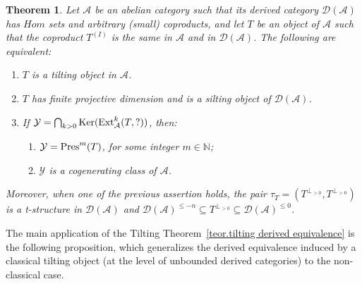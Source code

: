 \documentclass{proc-l}
\newcommand{\Ext}{{\rm Ext}}
\newtheorem{theorem}{Theorem}[section]
\theoremstyle{definition}
\theoremstyle{remark}
\numberwithin{equation}{section}
\begin{document}
\begin{theorem}{\rm\cite{NSZM}}
Let $\mathcal{A}$ be an abelian category such that its derived category $\mathcal{D}(\mathcal{A})$ has $Hom$ sets and arbitrary (small) coproducts,  and let $T$ be an object of $\mathcal{A}$ such that the coproduct $T^{(I)}$ is the same in $\mathcal{A}$ and in 
$\mathcal{D}(\mathcal{A})$. The following are equivalent:
\begin{enumerate}
\item $T$ is a tilting object in $\mathcal{A}$.
\item $T$ has finite projective dimension and is a silting object of $\mathcal{D}(\mathcal{A})$.
\item If $\mathcal{Y}=\bigcap_{k>0}{\rm Ker}(\Ext^k_\mathcal{A}(T,?))$, then:
\begin{enumerate}
\item[\rm (a)]$\mathcal{Y}={\rm Pres}^m(T)$, for some integer $m \in \mathbb{N}$;
\item[\rm (b)]
$\mathcal{Y}$ is a cogenerating class of $\mathcal{A}$.
\end{enumerate}
\end{enumerate}
Moreover, when one of the previous assertion holds, the pair $\tau_T =(T^{\perp_{>0}},T^{\perp_{>0}})$ is a t-structure in $\mathcal{D}(\mathcal{A})$ and $\mathcal{D}(\mathcal{A})^{\leq-n}\subseteq T^{\perp_{>0}} \subseteq \mathcal{D}(\mathcal{A})^{\leq0}$. 
\end{theorem}




The main application of the Tilting Theorem~\ref{teor.tilting derived equivalence} 
is the following proposition, which generalizes the derived equivalence induced by a classical tilting object (at the level of unbounded derived categories) to the non-classical case. 
\end{document}
